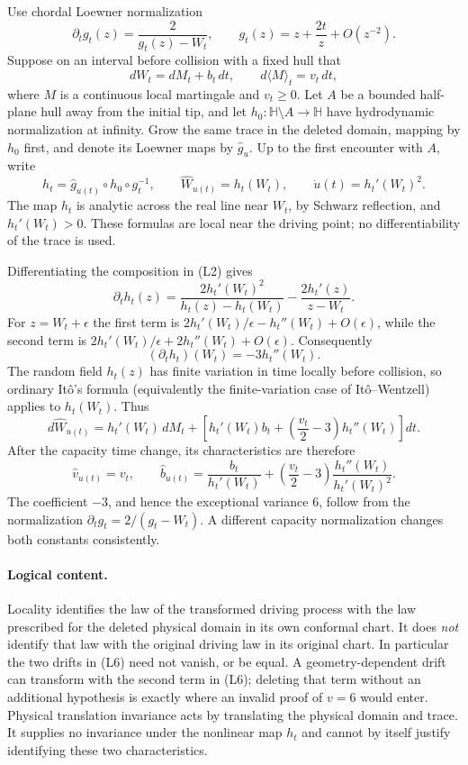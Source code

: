 \documentclass[11pt]{article}
\theoremstyle{definition}\newtheorem{definition}[theorem]{Definition}
\theoremstyle{remark}\newtheorem{remark}[theorem]{Remark}
\begin{document}
Use chordal Loewner normalization
\[
 \partial_t g_t(z)=\frac{2}{g_t(z)-W_t},\qquad
 g_t(z)=z+\frac{2t}{z}+O(z^{-2}).
\]
Suppose on an interval before collision with a fixed hull that
\[
 dW_t=dM_t+b_t\,dt,\qquad d\langle M\rangle_t=v_t\,dt,
 \tag{L1}
\]
where $M$ is a continuous local martingale and $v_t\geq0$.
Let $A$ be a bounded half-plane hull away from the initial tip, and let
$h_0:\mathbb H\setminus A\to\mathbb H$ have hydrodynamic normalization at
infinity.  Grow the same trace in the deleted domain, mapping by $h_0$ first,
and denote its Loewner maps by $\widehat g_u$.  Up to the first encounter with
$A$, write
\[
 h_t=\widehat g_{u(t)}\circ h_0\circ g_t^{-1},\qquad
 \widehat W_{u(t)}=h_t(W_t),\qquad
 \dot u(t)=h_t'(W_t)^2.
 \tag{L2}
\]
The map $h_t$ is analytic across the real line near $W_t$, by Schwarz
reflection, and $h_t'(W_t)>0$.  These formulas are local near the driving
point; no differentiability of the trace is used.

Differentiating the composition in (L2) gives
\[
 \partial_t h_t(z)=
 \frac{2h_t'(W_t)^2}{h_t(z)-h_t(W_t)}
 -\frac{2h_t'(z)}{z-W_t}.
 \tag{L3}
\]
For $z=W_t+\epsilon$ the first term is
$2h_t'(W_t)/\epsilon-h_t''(W_t)+O(\epsilon)$,
while the second term is
$2h_t'(W_t)/\epsilon+2h_t''(W_t)+O(\epsilon)$.
Consequently
\[
 (\partial_t h_t)(W_t)=-3h_t''(W_t).
 \tag{L4}
\]
The random field $h_t(z)$ has finite variation in time locally before
collision, so ordinary It\^o's formula (equivalently the finite-variation
case of It\^o--Wentzell) applies to $h_t(W_t)$.  Thus
\[
 d\widehat W_{u(t)}=
 h_t'(W_t)\,dM_t+
 \left[h_t'(W_t)b_t+
        \left(\frac{v_t}{2}-3\right)h_t''(W_t)\right]dt.
 \tag{L5}
\]
After the capacity time change, its characteristics are therefore
\[
 \boxed{\quad
 \widehat v_{u(t)}=v_t,\qquad
 \widehat b_{u(t)}=
   \frac{b_t}{h_t'(W_t)}+
   \left(\frac{v_t}{2}-3\right)
       \frac{h_t''(W_t)}{h_t'(W_t)^2}.
 \quad}
 \tag{L6}
\]
The coefficient $-3$, and hence the exceptional variance $6$, follow from
the normalization $\partial_tg_t=2/(g_t-W_t)$.  A different capacity
normalization changes both constants consistently.

\paragraph{Logical content.}
Locality identifies the law of the transformed driving process with the
law prescribed for the deleted physical domain in its own conformal chart.
It does \emph{not} identify that law with the original driving law in its
original chart.  In particular the two drifts in (L6) need not vanish,
or be equal.  A geometry-dependent drift can transform with the second
term in (L6); deleting that term without an additional hypothesis is exactly
where an invalid proof of $v=6$ would enter.  Physical translation invariance
acts by translating the physical domain and trace.  It supplies no invariance
under the nonlinear map $h_t$ and cannot by itself justify identifying these
two characteristics.
\end{document}
